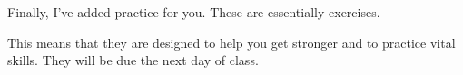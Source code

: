 \documentclass[notitlepage,oneside,openany]{tufte-book}
\begin{document}
Finally, I've added practice for you. These are essentially exercises.

\begin{exercise}
This means that they are designed to help you get stronger and to practice vital skills. They will be due the next day of class.
\end{exercise}


\mainmatter



















\end{document}
